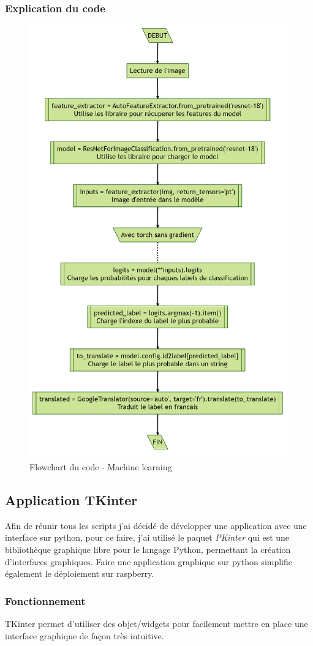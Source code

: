 \subsubsection{Explication du code}

\begin{figure}[h]
	\centering
	\includegraphics[width=0.483\linewidth]{../Flowcharts/img_descr.png}
	\caption{Flowchart du code - Machine learning}
	\label{fig:img_descr_flow}
\end{figure}


\clearpage	
\subsection{Application TKinter}
Afin de réunir tous les scripts j'ai décidé de développer une application avec une interface sur python, pour ce faire, j'ai utilisé le paquet \textit{PKinter} qui est une  bibliothèque graphique libre pour le langage Python, permettant la création d'interfaces graphiques. Faire une application graphique sur python simplifie également le déploiement sur raspberry.

\subsubsection{Fonctionnement}
TKinter permet d'utiliser des objet/widgets pour facilement mettre en place une interface graphique de façon très intuitive.

